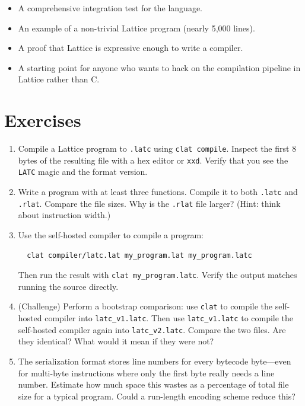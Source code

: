 \begin{itemize}
  \item A comprehensive integration test for the language.
  \item An example of a non-trivial Lattice program (nearly 5,000 lines).
  \item A proof that Lattice is expressive enough to write a compiler.
  \item A starting point for anyone who wants to hack on the compilation pipeline in Lattice rather than C.
\end{itemize}


\section*{Exercises}

\begin{enumerate}
  \item Compile a Lattice program to \lstinline|.latc| using \lstinline|clat compile|. Inspect the first 8 bytes of the resulting file with a hex editor or \lstinline|xxd|. Verify that you see the \texttt{LATC} magic and the format version.

  \item Write a program with at least three functions. Compile it to both \lstinline|.latc| and \lstinline|.rlat|. Compare the file sizes. Why is the \lstinline|.rlat| file larger? (Hint: think about instruction width.)

  \item Use the self-hosted compiler to compile a program:
  \begin{verbatim}
  clat compiler/latc.lat my_program.lat my_program.latc
  \end{verbatim}
  Then run the result with \lstinline|clat my_program.latc|. Verify the output matches running the source directly.

  \item (Challenge) Perform a bootstrap comparison: use \lstinline|clat| to compile the self-hosted compiler into \lstinline|latc_v1.latc|. Then use \lstinline|latc_v1.latc| to compile the self-hosted compiler again into \lstinline|latc_v2.latc|. Compare the two files. Are they identical? What would it mean if they were not?

  \item The serialization format stores line numbers for every bytecode byte---even for multi-byte instructions where only the first byte really needs a line number. Estimate how much space this wastes as a percentage of total file size for a typical program. Could a run-length encoding scheme reduce this?
\end{enumerate}

